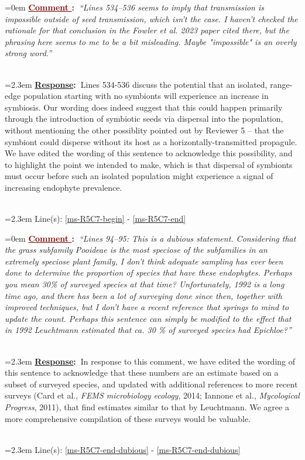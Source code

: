 \documentclass[12pt]{article}
\newcounter{cN}
\newcommand{\comment}[1]{
	\vspace{2em}
	\refstepcounter{cN} %
	\noindent \hangindent=0em \textbf{\textcolor{Maroon}{\uline{Comment \thecN}:~}}\emph{``#1''}
	}
\newcommand{\response}[1]{
	\\[0.25em]
	\hangindent=2.3em \textbf{\textcolor{NavyBlue}{\uline{Response}:~}}#1
	}
\newcommand{\linesref}[2]{
		\\[0.25em]
	\hangindent=2.3em {\color{Mahogany} Line(s): \ref{#1} - \ref{#2}}
}
\begin{document}
\comment{Lines 534–536 seems to imply that transmission is impossible outside of seed transmission, which isn't the case. I haven't checked the rationale for that conclusion in the Fowler et al. 2023 paper cited there, but the phrasing here seems to me to be a bit misleading. Maybe "impossible" is an overly strong word.}
\response{Lines 534-536 discuss the potential that an isolated, range-edge population starting with no symbionts will experience an increase in symbiosis. Our wording does indeed suggest that this could happen primarily through the introduction of symbiotic seeds via dispersal into the population, without mentioning the other possiblity pointed out by Reviewer 5 -- that the symbiont could disperse without its host as a horizontally-transmitted propagule. We have edited the wording of this sentence to acknowledge this possibility, and to highlight the point we intended to make, which is that dispersal of symbionts must occur before such an isolated population might experience a signal of increasing endophyte prevalence.}
\linesref{ms-R5C7-begin}{ms-R5C7-end}

\comment{Lines 94–95: This is a dubious statement. Considering that the grass subfamily Pooideae is the most speciose of the subfamilies in an extremely speciose plant family, I don't think adequate sampling has ever been done to determine the proportion of species that have these endophytes. Perhaps you mean 30\% of surveyed species at that time? Unfortunately, 1992 is a long time ago, and there has been a lot of surveying done since then, together with improved techniques, but I don't have a recent reference that springs to mind to update the count. Perhaps this sentence can simply be modified to the effect that in 1992 Leuchtmann estimated that ca. 30 \% of surveyed species had Epichloe?}
\response{In response to this comment, we have edited the wording of this sentence to acknowledge that these numbers are an estimate based on a subset of surveyed species, and updated with additional references to more recent surveys (Card et al., \emph{FEMS microbiology ecology}, 2014; Iannone et al., \emph{Mycological Progress}, 2011), that find estimates similar to that by Leuchtmann. We agree a more comprehensive compilation of these surveys would be valuable.}
\linesref{ms-R5C7-end-dubious}{ms-R5C7-end-dubious}
\end{document}

